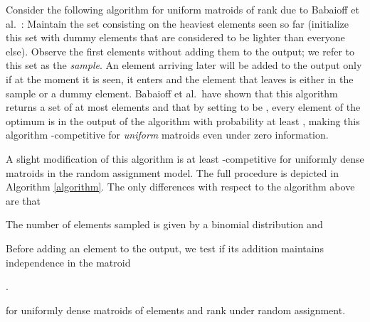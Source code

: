 \documentclass[letterpaper,11pt]{article}
\theoremstyle{definition}
\theoremstyle{remark}
\begin{document}
Consider the following algorithm for uniform matroids of rank  due to Babaioff et al.~\cite{babaioff_knapsack_2007}: Maintain the set  consisting on the  heaviest elements seen so far (initialize this set with  dummy elements that are considered to be lighter than everyone else). Observe the first  elements without adding them to the output; we refer to this set as the \emph{sample}. An element arriving later will be added to the output only if at the moment it is seen, it enters  and the element that leaves  is either in the sample or a dummy element. Babaioff et al.~have shown that this algorithm returns a set of at most  elements and that by setting  to be , every element of the optimum is in the output of the algorithm with probability at least , making this algorithm -competitive for \emph{uniform} matroids even under zero information.

A slight modification of this algorithm is at least -competitive for uniformly dense matroids in the random assignment model. The full procedure is depicted in Algorithm \ref{algorithm}. The only differences with respect to the algorithm above are that \begin{inparaenum}[(i)]\item The number of elements sampled is given by a binomial distribution  and \item Before adding an element to the output, we test if its addition maintains independence in the matroid\end{inparaenum}.

\begin{algorithm}[h!!!]
\caption{for uniformly dense matroids of  elements and rank  under random assignment.}

\label{algorithm}
\begin{algorithmic}[1]
\EndIf
\EndFor
{}
\end{algorithmic}
\end{algorithm}
\end{document}
